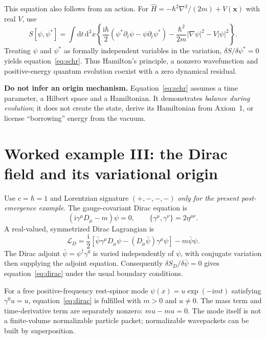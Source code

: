 \documentclass[11pt,a4paper]{article}
\newcommand{\dd}{\mathrm{d}}
\newcommand{\ii}{\mathrm{i}}
\theoremstyle{tmon}
\theoremstyle{definition}
\begin{document}
This equation also follows from an action. For $\widehat H=-\hbar^2\nabla^2/(2m)+V(\bm x)$ with real $V$, use
\begin{equation}\label{eq:schraction}
S[\psi,\psi^*]=\int\dd t\,\dd^3x\left\{
\frac{\ii\hbar}{2}(\psi^*\partial_t\psi-\psi\partial_t\psi^*)
-\frac{\hbar^2}{2m}|\nabla\psi|^2-V|\psi|^2\right\}.
\end{equation}
Treating $\psi$ and $\psi^*$ as formally independent variables in the variation, $\delta S/\delta\psi^*=0$ yields equation~\eqref{eq:schr}. Thus Hamilton's principle, a nonzero wavefunction and positive-energy quantum evolution coexist with a zero dynamical residual.

\begin{warningbox}
\textbf{Do not infer an origin mechanism.} Equation~\eqref{eq:schr} assumes a time parameter, a Hilbert space and a Hamiltonian. It demonstrates \emph{balance during evolution}; it does not create the state, derive its Hamiltonian from Axiom~1, or license ``borrowing'' energy from the vacuum.
\end{warningbox}

\section{Worked example III: the Dirac field and its variational origin}
Use $c=\hbar=1$ and Lorentzian signature $(+,-,-,-)$ \emph{only for the present post-emergence example}. The gauge-covariant Dirac equation is
\begin{equation}\label{eq:dirac}
\boxed{(\ii\gamma^\mu D_\mu-m)\psi=0,\qquad
\{\gamma^\mu,\gamma^\nu\}=2\eta^{\mu\nu}.}
\end{equation}
A real-valued, symmetrized Dirac Lagrangian is
\begin{equation}\label{eq:DiracL}
\mathscr L_D=\frac{\ii}{2}\left[
\bar\psi\gamma^\mu D_\mu\psi-(D_\mu\bar\psi)\gamma^\mu\psi
\right]-m\bar\psi\psi.
\end{equation}
The Dirac adjoint $\bar\psi=\psi^\dagger\gamma^0$ is varied independently of $\psi$, with conjugate variation then supplying the adjoint equation. Consequently $\delta S_D/\delta\bar\psi=0$ gives equation~\eqref{eq:dirac} under the usual boundary conditions.

For a free positive-frequency rest-spinor mode $\psi(x)=u\exp(-\ii mt)$ satisfying $\gamma^0u=u$, equation~\eqref{eq:dirac} is fulfilled with $m>0$ and $u\ne0$. The mass term and time-derivative term are separately nonzero: $m u -m u=0$. The mode itself is not a finite-volume normalizable particle packet; normalizable wavepackets can be built by superposition.
\end{document}

